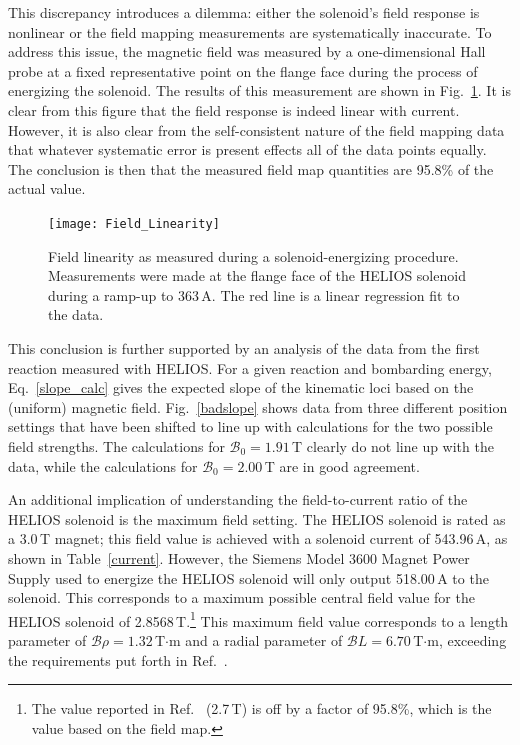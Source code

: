 This discrepancy introduces a dilemma: either the solenoid's field response is nonlinear or the field mapping measurements are systematically inaccurate.  To address this issue, the magnetic field was measured by a one-dimensional Hall probe at a fixed representative point on the flange face during the process of energizing the solenoid. The results of this measurement are shown in Fig.~\ref{field_lin}.  It is clear from this figure that the field response is indeed linear with current.  However, it is also clear from the self-consistent nature of the field mapping data that whatever systematic error is present effects all of the data points equally.  The conclusion is then that the measured field map quantities are 95.8\% of the actual value.

\begin{figure}[t]
\centering
\texttt{[image: Field\_Linearity]}%
\caption[Field linearity as measured during a solenoid-energizing procedure]{Field linearity as measured during a solenoid-energizing procedure.  Measurements were made at the flange face of the HELIOS solenoid during a ramp-up to 363\,A.  The red line is a linear regression fit to the data.}%
\label{field_lin}%
\end{figure}

This conclusion is further supported by an analysis of the data from the first reaction measured with HELIOS.  For a given reaction and bombarding energy, Eq.~\ref{slope_calc} gives the expected slope of the kinematic loci based on the (uniform) magnetic field.  Fig.~\ref{badslope} shows data from three different position settings that have been shifted to line up with calculations for the two possible field strengths.  The calculations for $\mathscr{B}_0=1.91$\,T clearly do not line up with the data, while the calculations for $\mathscr{B}_0=2.00$\,T are in good agreement.

An additional implication of understanding the field-to-current ratio of the HELIOS solenoid is the maximum field setting.  The HELIOS solenoid is rated as a 3.0\,T magnet; this field value is achieved with a solenoid current of 543.96\,A, as shown in Table~\ref{current}.  However, the Siemens Model 3600 Magnet Power Supply used to energize the HELIOS solenoid will only output 518.00\,A to the solenoid.  This corresponds to a maximum possible central field value for the HELIOS solenoid of 2.8568\,T.\footnote{The value reported in Ref.~\cite{Schiffer_2010} (2.7\,T) is off by a factor of 95.8\%, which is the value based on the field map.}  This maximum field value corresponds to  a length parameter of $\mathscr{B}\rho=1.32$\,T$\cdot$m and a radial parameter of $\mathscr{B}L=6.70$\,T$\cdot$m, exceeding the requirements put forth in Ref.~\cite{Wuosmaa_2007}.

